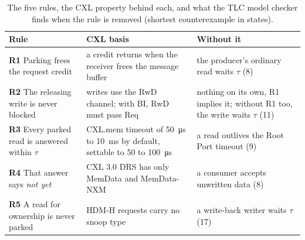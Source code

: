 \documentclass[journal]{IEEEtran}
\begin{document}
\begin{table}[t]
\centering
\caption{The five rules, the CXL property behind each, and what the TLC model checker finds when
the rule is removed (shortest counterexample in states).}
\label{tab:rules}
\scriptsize\setlength{\tabcolsep}{3pt}
\begin{tabular}{@{}>{\raggedright}p{2.35cm}>{\raggedright}p{2.75cm}>{\raggedright\arraybackslash}p{3.2cm}@{}}
\toprule
Rule & CXL basis & Without it \\
\midrule
\textbf{R1} Parking frees the request credit & a credit returns when the receiver frees the message
buffer~\cite{cxl3} & the producer's ordinary read waits $\tau$ (8) \\
\textbf{R2} The releasing write is never blocked & writes use the RwD channel; with BI, RwD must pass
Req~\cite{cxl3} & nothing on its own, R1 implies it; without R1 too, the write waits $\tau$ (11) \\
\textbf{R3} Every parked read is answered within $\tau$ & CXL.mem timeout of \SI{50}{\micro\second} to
\SI{10}{\milli\second} by default, settable to 50 to \SI{100}{\micro\second}~\cite{cxl32} & a read outlives the Root Port timeout (9) \\
\textbf{R4} That answer says \emph{not yet} & CXL 3.0 DRS has only MemData and MemData-NXM~\cite{cxl3} &
a consumer accepts unwritten data (8) \\
\textbf{R5} A read for ownership is never parked & HDM-H requests carry no snoop type~\cite{cxl32} & a
write-back writer waits $\tau$ (17) \\
\bottomrule
\end{tabular}
\end{table}
\end{document}
